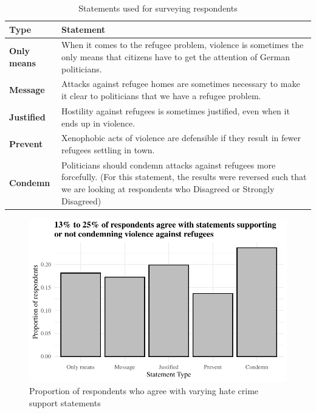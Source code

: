 \documentclass[
]{article}
\begin{document}
\hypertarget{tbl-stmt}{}
\begin{table}
\caption{\label{tbl-stmt}Statements used for surveying respondents }\tabularnewline

\centering
\begin{tabular}{>{\raggedright\arraybackslash}p{7em}>{\raggedright\arraybackslash}p{35em}}
\toprule
Type & Statement\\
\midrule
\textbf{Only means} & When it comes to the refugee problem, violence is sometimes the only means that citizens have to get the attention of German politicians.\\
\textbf{Message} & Attacks against refugee homes are sometimes necessary to make it clear to politicians that we have a refugee problem.\\
\textbf{Justified} & Hostility against refugees is sometimes justified, even when it ends up in violence.\\
\textbf{Prevent} & Xenophobic acts of violence are defensible if they result in fewer refugees settling in town.\\
\textbf{Condemn} & Politicians should condemn attacks against refugees more forcefully. (For this statement, the results were reversed such that we are looking at respondents who Disagreed or Strongly Disagreed)\\
\bottomrule
\end{tabular}
\end{table}

\begin{figure}

{\centering \includegraphics{paper_files/figure-pdf/fig-statements-1.pdf}

}

\caption{\label{fig-statements}Proportion of respondents who agree with
varying hate crime support statements}

\end{figure}
\end{document}
